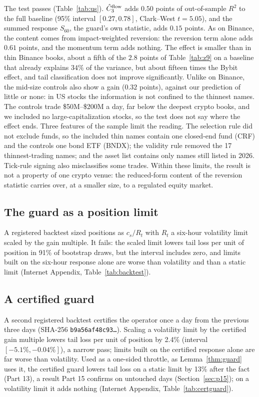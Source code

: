 \documentclass[12pt]{article}
\theoremstyle{definition}
\theoremstyle{remark}
\begin{document}
The test passes (Table~\ref{tab:us}). $\hat C_3^{\rm flow}$ adds $0.50$ points of out-of-sample $R^2$ to the full baseline (95\% interval $[0.27,0.78]$, Clark--West $t=5.05$), and the summed response $S_{60}$, the guard's own statistic, adds $0.15$ points. As on Binance, the content comes from impact-weighted reversion: the reversion term alone adds $0.61$ points, and the momentum term adds nothing. The effect is smaller than in thin Binance books, about a fifth of the $2.8$ points of Table~\ref{tab:z9} on a baseline that already explains $34\%$ of the variance, but about fifteen times the Bybit effect, and tail classification does not improve significantly. Unlike on Binance, the mid-size controls also show a gain ($0.32$ points), against our prediction of little or none: in US stocks the information is not confined to the thinnest names. The controls trade \$50M--\$200M a day, far below the deepest crypto books, and we included no large-capitalization stocks, so the test does not say where the effect ends. Three features of the sample limit the reading. The selection rule did not exclude funds, so the included thin names contain one closed-end fund (CRF) and the controls one bond ETF (BNDX); the validity rule removed the 17 thinnest-trading names; and the asset list contains only names still listed in 2026. Tick-rule signing also misclassifies some trades. Within these limits, the result is not a property of one crypto venue: the reduced-form content of the reversion statistic carries over, at a smaller size, to a regulated equity market.

\subsection{The guard as a position limit}\label{sec:backtest}
A registered backtest sized positions as $c_s/R_t$ with $R_t$ a six-hour volatility limit scaled by the gain multiple. It fails: the scaled limit lowers tail loss per unit of position in 91\% of bootstrap draws, but the interval includes zero, and limits built on the six-hour response alone are worse than volatility and than a static limit (Internet Appendix, Table~\ref{tab:backtest}).

\subsection{A certified guard}\label{sec:certguard}
A second registered backtest certifies the operator once a day from the previous three days (SHA-256 \texttt{b9a56af48c93\ldots}). Scaling a volatility limit by the certified gain multiple lowers tail loss per unit of position by 2.4\% (interval $[-5.1\%,-0.04\%]$), a narrow pass; limits built on the certified response alone are far worse than volatility. Used as a one-sided throttle, as Lemma~\ref{thm:guard} uses it, the certified guard lowers tail loss on a static limit by 13\% after the fact (Part 13), a result Part 15 confirms on untouched days (Section~\ref{sec:p15}); on a volatility limit it adds nothing (Internet Appendix, Table~\ref{tab:certguard}).
\end{document}
